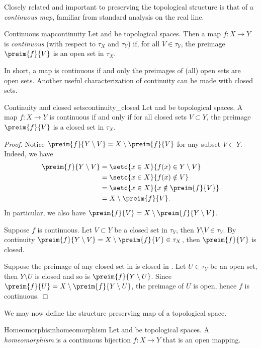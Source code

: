 Closely related and important to preserving the topological structure is that of a \emph{continuous map}, familiar from standard analysis on the real line.
\begin{definition}{Continuous map}{continuity}
    Let  and  be topological spaces. Then a map \(f : X \to Y\) is \emph{continuous} (with respect to \(\tau_X\) and \(\tau_Y\)) if, for all \(V \in \tau_Y\), the preimage \(\preim{f}{V}\) is an open set in \(\tau_X\).
\end{definition}

In short, a map is continuous if and only the preimages of (all) open sets are open sets. Another useful characterization of continuity can be made with closed sets.
\begin{proposition}{Continuity and closed sets}{continuity_closed}
    Let  and  be topological spaces. A map \(f : X \to Y\) is continuous if and only if for all closed sets \(V \subset Y\), the preimage \(\preim{f}{V}\) is a closed set in \(\tau_X\).
\end{proposition}
\begin{proof}
    Notice \(\preim{f}{Y\setminus V} = X \setminus \preim{f}{V}\) for any subset \(V \subset Y\). Indeed, we have
    \begin{align*}
        \preim{f}{Y \setminus V} &= \setc{x \in X}{f(x) \in Y \setminus V}\\&= \setc{x \in X}{f(x) \notin V}\\&=\setc{x \in X}{x \notin \preim{f}{V}}\\&= X \setminus \preim{f}{V}.
    \end{align*}
    In particular, we also have \(\preim{f}{V} = X \setminus \preim{f}{Y\setminus V}\).

    Suppose \(f\) is continuous. Let \(V \subset Y\) be a closed set in \(\tau_Y\), then \(Y\setminus V \in \tau_Y\). By continuity \(\preim{f}{Y \setminus V} = X \setminus\preim{f}{V} \in \tau_X\), then \(\preim{f}{V}\) is closed.

    Suppose the preimage of any closed set in  is closed in . Let \(U \in \tau_Y\) be an open set, then \(Y\setminus U\) is closed and so is \(\preim{f}{Y\setminus U}\). Since \(\preim{f}{U} = X \setminus \preim{f}{Y\setminus U}\), the preimage of \(U\) is open, hence \(f\) is continuous.
\end{proof}

We may now define the structure preserving map of a topological space.
\begin{definition}{Homeomorphism}{homeomorphism}
    Let  and  be topological spaces. A \emph{homeomorphism} is a continuous bijection \(f : X \to Y\) that is an open mapping.
\end{definition}

